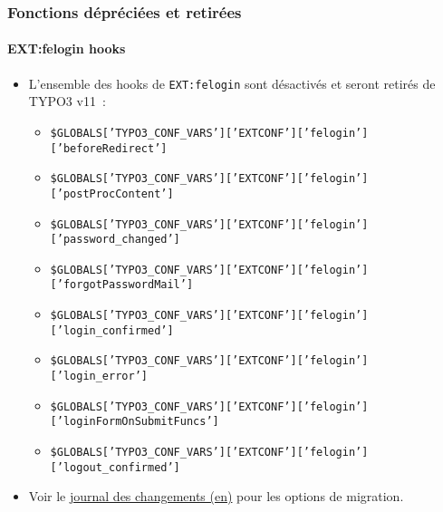 
\begin{frame}[fragile]
	\frametitle{Fonctions dépréciées et retirées}
	\framesubtitle{EXT:felogin hooks}

	\lstset{basicstyle=\tiny\ttfamily}

	\begin{itemize}
		\item L'ensemble des hooks de \texttt{EXT:felogin} sont désactivés et seront retirés de TYPO3 v11~:

			\begin{itemize}\tiny
				\item \texttt{\$GLOBALS['TYPO3\_CONF\_VARS']['EXTCONF']['felogin']['beforeRedirect']}
				\item \texttt{\$GLOBALS['TYPO3\_CONF\_VARS']['EXTCONF']['felogin']['postProcContent']}
				\item \texttt{\$GLOBALS['TYPO3\_CONF\_VARS']['EXTCONF']['felogin']['password\_changed']}
				\item \texttt{\$GLOBALS['TYPO3\_CONF\_VARS']['EXTCONF']['felogin']['forgotPasswordMail']}
				\item \texttt{\$GLOBALS['TYPO3\_CONF\_VARS']['EXTCONF']['felogin']['login\_confirmed']}
				\item \texttt{\$GLOBALS['TYPO3\_CONF\_VARS']['EXTCONF']['felogin']['login\_error']}
				\item \texttt{\$GLOBALS['TYPO3\_CONF\_VARS']['EXTCONF']['felogin']['loginFormOnSubmitFuncs']}
				\item \texttt{\$GLOBALS['TYPO3\_CONF\_VARS']['EXTCONF']['felogin']['logout\_confirmed']}
			\end{itemize}

		\item Voir le
			\href{https://docs.typo3.org/c/typo3/cms-core/master/en-us/Changelog/10.4/Deprecation-88740-DeprecateFeloginPibasePlugin.html}{journal des changements (en)}
			pour les options de migration.
	\end{itemize}

\end{frame}

